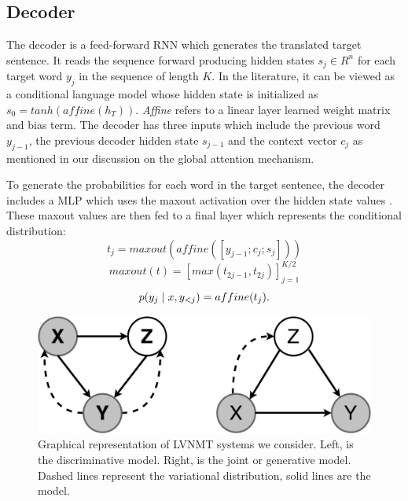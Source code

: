  




\subsection{Decoder}


The decoder is a feed-forward \ac{RNN} which generates the translated target sentence. It reads the sequence forward producing hidden states $s_{j} \in R^{n}$ for each target word $y_{j}$ in the sequence of length $K$. In the literature, it can be viewed as a conditional language model \cite{koehn2017NMT} whose hidden state is initialized as $s_{0} = tanh(affine(h_{T}))$. \textit{Affine} refers to a linear layer learned weight matrix and bias term. The decoder has three inputs which include the previous word $y_{j-1}$, the previous decoder hidden state $s_{j-1}$ and the context vector $c_{j}$ as mentioned in our discussion on the global attention mechanism. 


To generate the probabilities for each word in the target sentence, the decoder includes a \ac{MLP} which uses the maxout activation over the hidden state values \cite{goodfellow2013maxout}. These maxout values are then fed to a final layer which represents the conditional distribution:
\begin{equation}
	t_{j} = maxout(affine([y_{j-1}; c_{j}; s_{j} ]))
\end{equation}
\begin{equation}
	maxout(t) = [max(t_{2j -1}, t_{2j})]_{j=1}^{K / 2}
\end{equation}
\begin{equation}
p(y_{j} \; | \;{x, y_{<j}}) = affine(t_{j}).
\end{equation}


\begin{figure}
	\includegraphics[width=\linewidth]{PGMofModels.pdf}
	\caption{Graphical representation of \ac{LVNMT} systems we consider. Left, is the discriminative model. Right, is the joint or generative model. Dashed lines represent the variational distribution, solid lines are the model.}
	\label{fig:graphicalmodel}
\end{figure}


